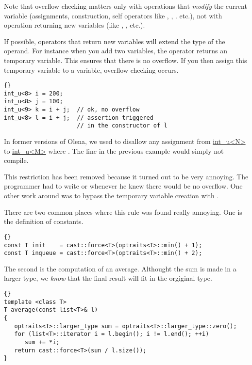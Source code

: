 Note that overflow checking matters only with operations that
\emph{modify} the current variable (assignments, construction, self
operators like \code{+=}, \code{-=}, \code{*=}. etc.), not with
operation returning new variables (like \code{+}, \code{*}, etc.).

If possible, operators that return new variables will extend the type
of the operand.  For instance when you add two 
variables, the \code{+} operator returns an  temporary
variable.  This ensures that there is no overflow.  If you then assign
this temporary variable to a  variable, overflow
checking occurs.

\begin{lstlisting}{}
int_u<8> i = 200;
int_u<8> j = 100;
int_u<9> k = i + j;  // ok, no overflow
int_u<8> l = i + j;  // assertion triggered
                     // in the constructor of l
\end{lstlisting}

\begin{FormerAssignCheck}
In former versions of Olena, we used to disallow any assignment from
\url{int_u<N>} to \url{int_u<M>} where .  The
 line in the previous example would simply not
compile.

This restriction has been removed because it turned out to be very
annoying.  The programmer had to write
 or
 whenever he knew there would
be no overflow.  One other work around was to bypass the temporary
variable creation with .

There are two common places where this rule was found really annoying.
One is the definition of constants.
\begin{lstlisting}{}
const T init    = cast::force<T>(optraits<T>::min() + 1);
const T inqueue = cast::force<T>(optraits<T>::min() + 2);
\end{lstlisting}

The second is the computation of an average.  Althought the sum is
made in a larger type, we \emph{know} that the final result will fit
in the orgiginal type.
\begin{lstlisting}{}
template <class T>
T average(const list<T>& l)
{
   optraits<T>::larger_type sum = optraits<T>::larger_type::zero();
   for (list<T>::iterator i = l.begin(); i != l.end(); ++i)
      sum += *i;
   return cast::force<T>(sun / l.size());
}
\end{lstlisting}
\end{FormerAssignCheck}

